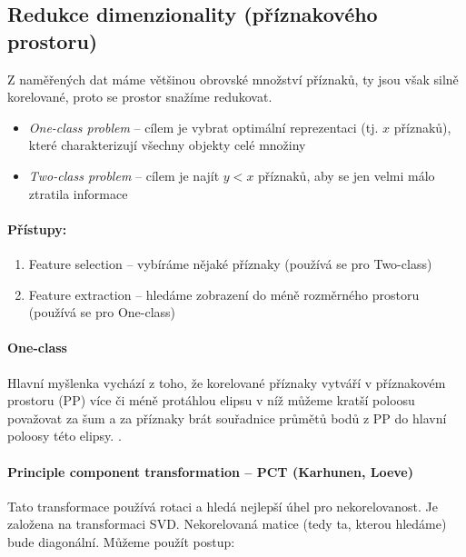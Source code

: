 

\subsection{Redukce dimenzionality (příznakového prostoru)}
Z naměřených dat máme většinou obrovské množství příznaků, ty jsou však silně korelované, proto se prostor 
snažíme redukovat.

\begin{itemize}
	\item \emph{One-class problem} -- cílem je vybrat optimální reprezentaci (tj. $x$ příznaků), které charakterizují 
	všechny objekty celé množiny
	\item \emph{Two-class problem} -- cílem je najít $y<x$ příznaků, aby se jen velmi málo ztratila informace
\end{itemize}

\paragraph{Přístupy:}
\begin{enumerate}
	\item Feature selection -- vybíráme nějaké příznaky (používá se pro Two-class)
	\item Feature extraction -- hledáme zobrazení do méně rozměrného prostoru (používá se pro One-class)
\end{enumerate}

\paragraph{One-class}

Hlavní myšlenka vychází z toho, že korelované příznaky vytváří v příznakovém prostoru (PP) více či méně protáhlou
elipsu v níž můžeme kratší poloosu považovat za šum a za příznaky brát souřadnice průmětů bodů z PP do hlavní poloosy
této elipsy.
.

\paragraph{Principle component transformation -- PCT (Karhunen, Loeve)}
Tato transformace používá rotaci a hledá nejlepší úhel pro nekorelovanost. 
Je založena na transformaci SVD. Nekorelovaná matice (tedy ta, kterou hledáme) bude diagonální. Můžeme použít postup:

